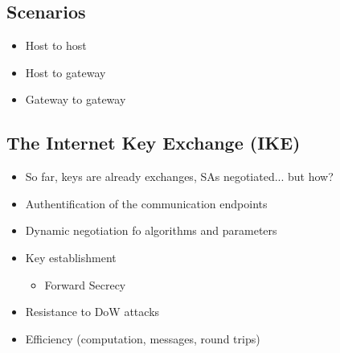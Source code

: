 \subsection{Scenarios}
\begin{itemize}
  \item Host to host
  \item Host to gateway
  \item Gateway to gateway
\end{itemize}

\subsection{The Internet Key Exchange (IKE)}
\begin{itemize}
  \item So far, keys are already exchanges, SAs negotiated... but how?
  \item Authentification of the communication endpoints
  \item Dynamic negotiation fo algorithms and parameters
  \item Key establishment
    \begin{itemize}
      \item Forward Secrecy
    \end{itemize}
  \item Resistance to DoW attacks
  \item Efficiency (computation, messages, round trips)
\end{itemize}

